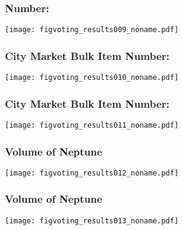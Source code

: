 
\begin{frame}
  \frametitle{Number:}

  \begin{center}
    \texttt{[image: figvoting\_results009\_noname.pdf]}    
  \end{center}

\end{frame}

\begin{frame}
  \frametitle{City Market Bulk Item Number:}

  \begin{center}
    \texttt{[image: figvoting\_results010\_noname.pdf]}    
  \end{center}

\end{frame}

\begin{frame}
  \frametitle{City Market Bulk Item Number:}

  \begin{center}
    \texttt{[image: figvoting\_results011\_noname.pdf]}    
  \end{center}

\end{frame}

\begin{frame}
  \frametitle{Volume of Neptune}

  \begin{center}
    \texttt{[image: figvoting\_results012\_noname.pdf]}    
  \end{center}

\end{frame}

\begin{frame}
  \frametitle{Volume of Neptune}

  \begin{center}
    \texttt{[image: figvoting\_results013\_noname.pdf]}    
  \end{center}

\end{frame}


